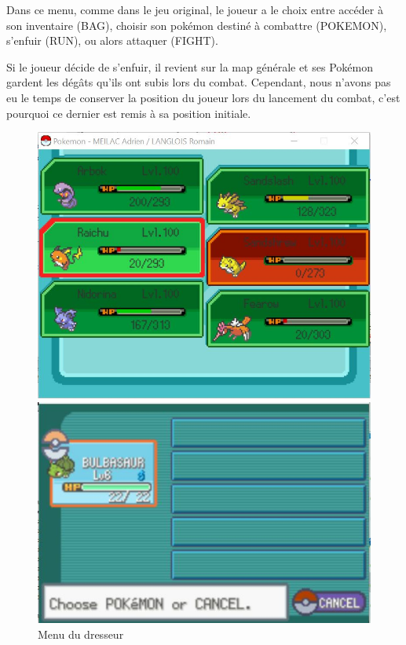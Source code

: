 \documentclass[a4paper,twoside, openany,11pt]{book}
\begin{document}
Dans ce menu, comme dans le jeu original, le joueur a le choix entre accéder à son inventaire (BAG), choisir son pokémon destiné à combattre (POKEMON), s'enfuir (RUN), ou alors attaquer (FIGHT).

Si le joueur décide de s'enfuir, il revient sur la map générale et ses Pokémon gardent les dégâts qu'ils ont subis lors du combat. Cependant, nous n'avons pas eu le temps de conserver la position du joueur lors du lancement du combat, c'est pourquoi ce dernier est remis à sa position initiale. 

\begin{figure}[!h]
\begin{minipage}{0.49\textwidth}
\includegraphics[scale = 0.6]{Images/swapMenu.jpg}
\end{minipage}
\begin{minipage}{0.49\textwidth}
\includegraphics[scale = 0.84]{Images/vrai_jeu_swapMenu.jpg}
\end{minipage}
\caption{Menu du dresseur}
\end{figure}
\end{document}
